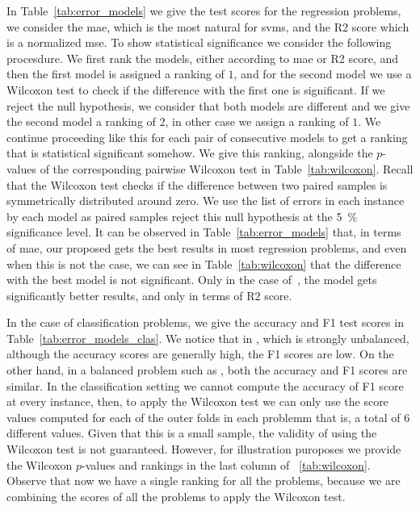 In Table~\ref{tab:error_models} we give the test scores for the regression problems, we consider the \acrshort{mae}, which is the most natural for \acrshort{svms}, and the R2 score which is a normalized \acrshort{mse}.
To show statistical significance we consider the following procesdure. We first rank the models, either according to \acrshort{mae} or R2 score, and then the first model is assigned a ranking of $1$, and for the second model we use a Wilcoxon test to check if the difference with the first one is significant. If we reject the null hypothesis, we consider that both models are different and we give the second model a ranking of $2$, in other case we assign a ranking of $1$. We continue proceeding like this for each pair of consecutive models to get a ranking that is statistical significant somehow. We give this ranking, alongside the $p$-values of the corresponding pairwise Wilcoxon test in Table~\ref{tab:wilcoxon}.
%
Recall that the Wilcoxon test checks if the difference between two paired samples is symmetrically distributed around zero. We use the list of errors in each instance by each model as paired samples reject this null hypothesis at the \SI{5}{\percent} significance level.
%
It can be observed in Table~\ref{tab:error_models} that, in terms of \acrshort{mae}, our proposed  gets the best results in most regression problems, and even when this is not the case, we can see in Table~\ref{tab:wilcoxon} that the difference with the best model is not significant. Only in the case of~, the  model gets significantly better results, and only in terms of R2 score.
%

In the case of classification problems, we give the accuracy and F1 test scores in Table~\ref{tab:error_models_clas}. We notice that in , which is strongly unbalanced, although the accuracy scores are generally high, the F1 scores are low. On the other hand, in a balanced problem such as , both the accuracy and F1 scores are similar.
%
In the classification setting we cannot compute the accuracy of F1 score at every instance, then, to apply the Wilcoxon test we can only use the score values computed for each of the outer folds in each problemm that is, a total of $6$ different values.
Given that this is a small sample, the validity of using the Wilcoxon test is not guaranteed. However, for illustration puroposes we provide the Wilcoxon $p$-values and rankings in the last column of ~\ref{tab:wilcoxon}. Observe that now we have a single ranking for all the problems, because we are combining the scores of all the problems to apply the Wilcoxon test.


